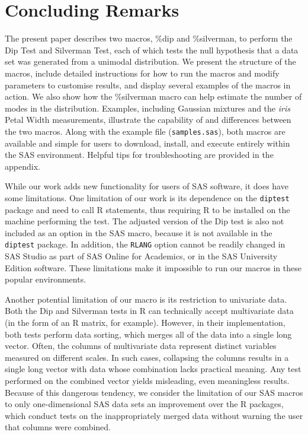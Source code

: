 \documentclass[]{interact}
\theoremstyle{plain}%
\theoremstyle{definition}
\theoremstyle{remark}
\begin{document}
\section{Concluding Remarks}
The present paper describes two macros, \%dip and \%silverman, to perform the Dip Test and Silverman Test, each of which tests the null hypothesis that a data set was generated from a unimodal distribution. We %
present the structure of the macros, include detailed instructions for how to run the macros and modify parameters to customise results, and display several examples of the macros in action. We also show how the \%silverman macro can help estimate the number of modes in the distribution. Examples, including Gaussian mixtures and the {\it iris} Petal Width measurements, illustrate the capability of and differences between the two macros. Along with the example file (\texttt{samples.sas}), both macros are available and simple for users to download, install, and execute entirely within the SAS environment. Helpful tips for troubleshooting are provided in the appendix.

While our work adds new functionality for users of SAS software, it does have some limitations. One limitation of our work is its dependence on the \texttt{diptest} package and need to call R statements, thus requiring R to be installed on the machine performing the test. The adjusted version of the Dip test is also not included as an option in the SAS macro, because it is not available in the \texttt{diptest} package. In addition, the \texttt{RLANG} option cannot be readily changed in SAS Studio as part of SAS Online for Academics, or in the SAS University Edition software. These limitations make it impossible to run our macros in these popular environments. 

Another potential limitation of our macro is its restriction to univariate data. Both the Dip and Silverman tests in R can technically accept multivariate data (in the form of an R matrix, for example). However, in their implementation, both tests perform data sorting, which merges all of the data into a single long vector. Often, the columns of multivariate data represent distinct variables measured on different scales. In such cases, collapsing the columns results in a single long vector with data whose combination lacks practical meaning. Any test performed on the combined vector yields misleading, even meaningless results. Because of this dangerous tendency, we consider the limitation of our SAS macros to only one-dimensional SAS data sets an improvement over the R packages, which conduct tests on the inappropriately merged data without warning the user that columns were combined. 
\end{document}
